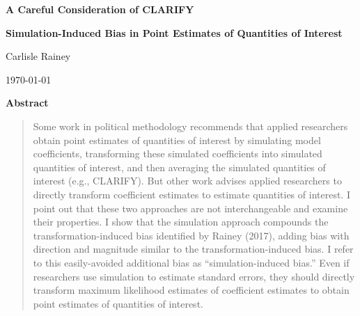 \documentclass[12pt]{article}
\begin{document}
\begin{center}

{\Large \textbf{A Careful Consideration of CLARIFY}
}

\vspace{0.2cm}


{\textbf{Simulation-Induced Bias in Point Estimates of Quantities of Interest}}



\vspace{1cm}

Carlisle Rainey

\vspace{1cm}
\today
\end{center}
\vspace{5mm}



{\centerline{\textbf{Abstract}}}
\begin{quote}\noindent
Some work in political methodology recommends that applied researchers obtain point estimates of quantities of interest by simulating model coefficients, transforming these simulated coefficients into simulated quantities of interest, and then averaging the simulated quantities of interest (e.g., CLARIFY). 
But other work advises applied researchers to directly transform coefficient estimates to estimate quantities of interest. 
I point out that these two approaches are not interchangeable and examine their properties. 
I show that the simulation approach compounds the transformation-induced bias identified by Rainey (2017), adding bias with direction and magnitude similar to the transformation-induced bias. I refer to this easily-avoided additional bias as ``simulation-induced bias.'' Even if researchers use simulation to estimate standard errors, they should directly transform maximum likelihood estimates of coefficient estimates to obtain point estimates of quantities of interest.
\end{quote}
\end{document}
